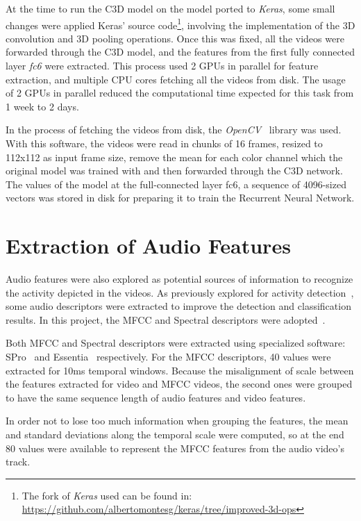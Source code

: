 At the time to run the C3D model on the model ported to \textit{Keras}, some small changes were applied Keras' source code\footnote{The fork of \textit{Keras} used can be found in: \url{https://github.com/albertomontesg/keras/tree/improved-3d-ops}}, involving the implementation of the 3D convolution and 3D pooling operations. Once this was fixed, all the videos were forwarded through the C3D model, and the features from the first fully connected layer \textit{fc6} were extracted.
This process used 2 GPUs in parallel for feature extraction, and multiple CPU cores fetching all the videos from disk. The usage of 2 GPUs in parallel reduced the computational time expected for this task from 1 week to 2 days.

In the process of fetching the videos from disk, the \textit{OpenCV}~\cite{opencv_library} library was used. With this software, the videos were read in chunks of 16 frames, resized to 112x112 as input frame size, remove the mean for each color channel which the original model was trained with and then forwarded through the C3D network. The values of the model at the full-connected layer fc6, a sequence of 4096-sized vectors was stored in disk for preparing it to train the Recurrent Neural Network.

\section{Extraction of Audio Features}

Audio features were also explored as potential sources of information to recognize the activity depicted in the videos. As previously explored for activity detection~\cite{xu2015uts}, some audio descriptors were extracted to improve the detection and classification results. In this project, the MFCC and Spectral descriptors were adopted~\cite{heittola2013context}.

Both MFCC and Spectral descriptors were extracted using specialized software: SPro~\cite{gravier2010spro} and Essentia~\cite{bogdanov2013essentia} respectively. For the MFCC descriptors, 40 values were extracted for 10ms temporal windows. Because the misalignment of scale between the features extracted for video and MFCC videos, the second ones were grouped to have the same sequence length of audio features and video features.

In order not to lose too much information when grouping the features, the mean and standard deviations along the temporal scale were computed, so at the end 80 values were available to represent the MFCC features from the audio video's track.

